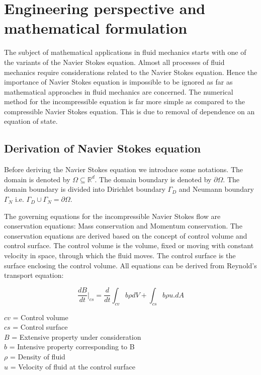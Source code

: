 \documentclass[a4paper,12pt]{book}
\begin{document}
\chapter{Engineering perspective and mathematical formulation} 

The subject of mathematical applications in fluid mechanics starts with  one of the variants of the Navier Stokes equation. Almost all processes of fluid mechanics require considerations related to the Navier Stokes equation. Hence the importance of Navier Stokes equation is impossible to be ignored as far as mathematical approaches in fluid mechanics are concerned. The numerical method for the incompressible equation is far more simple as compared to the compressible Navier Stokes equation. This is due to removal of dependence on an equation of state. 

\section{Derivation of Navier Stokes equation}\cite{white}

Before deriving the Navier Stokes equation we introduce some notations. The domain is denoted by $\Omega \subseteq \mathbb{R}^d $. The domain boundary is denoted by $\partial \Omega$. The domain boundary is divided into Dirichlet boundary $\Gamma_D$ and Neumann boundary $\Gamma_N$ i.e. $\Gamma_D \cup \Gamma_N = \partial \Omega $. 

The governing equations for the incompressible Navier Stokes flow are conservation equations: Mass conservation and Momentum conservation. The conservation equations are derived based on the concept of control volume and control surface. The control volume is the volume, fixed or moving with constant velocity in space, through which the fluid moves. The control surface is the surface enclosing the control volume. All equations can be derived from Reynold's transport equation:\cite{white}


\begin{equation} \label{rtt} 
\frac{dB}{dt}|_{cs} = \frac{d}{dt} \int_{cv} b \rho dV + \int_{cs} b \rho u.dA 
\end{equation}

\begin{center}
$cv$ = Control volume\\
$cs$ = Control surface\\
$B$ = Extensive property under consideration  \\
$b$ = Intensive property corresponding to B \\
$\rho$ = Density of fluid \\
$u$ = Velocity of fluid at the control surface \\
\end{center}
\end{document}
